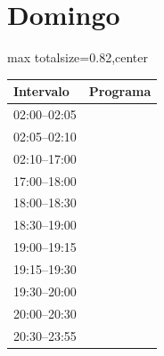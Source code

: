\documentclass[11pt,a4paper]{article}
\begin{document}
\section*{Domingo}
\begin{center}
\begin{adjustbox}{max totalsize={\textwidth}{0.82\textheight},center}
\begin{tabular}{|p{3.6cm}|p{11cm}|}
\hline
\textbf{Intervalo} & \textbf{Programa} \\
\hline
{\centering\rule{0pt}{0.93ex}02:00--02:05} & {\centering\rule{0pt}{0.93ex}} \\
{\centering\rule{0pt}{0.93ex}02:05--02:10} & {\centering\rule{0pt}{0.93ex}} \\
{\centering\rule{0pt}{166.13ex}02:10--17:00} & {\centering\rule{0pt}{166.13ex}} \\
{\centering\rule{0pt}{11.20ex}17:00--18:00} & {\centering\rule{0pt}{11.20ex}} \\
{\centering\rule{0pt}{5.60ex}18:00--18:30} & {\centering\rule{0pt}{5.60ex}} \\
{\centering\rule{0pt}{5.60ex}18:30--19:00} & {\centering\rule{0pt}{5.60ex}} \\
{\centering\rule{0pt}{2.80ex}19:00--19:15} & {\centering\rule{0pt}{2.80ex}} \\
{\centering\rule{0pt}{2.80ex}19:15--19:30} & {\centering\rule{0pt}{2.80ex}} \\
{\centering\rule{0pt}{5.60ex}19:30--20:00} & {\centering\rule{0pt}{5.60ex}} \\
{\centering\rule{0pt}{5.60ex}20:00--20:30} & {\centering\rule{0pt}{5.60ex}} \\
{\centering\rule{0pt}{38.27ex}20:30--23:55} & {\centering\rule{0pt}{38.27ex}} \\
\hline
\end{tabular}
\end{adjustbox}
\end{center}
\end{document}
